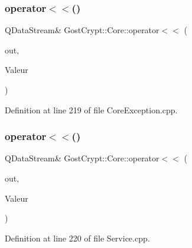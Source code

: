 \subsubsection{\texorpdfstring{operator$<$$<$()}{operator<<()}\hspace{0.1cm}{\footnotesize\ttfamily [42/56]}}
{\footnotesize\ttfamily Q\+Data\+Stream\& Gost\+Crypt\+::\+Core\+::operator$<$$<$ (\begin{DoxyParamCaption}\item[{Q\+Data\+Stream \&}]{out,  }\item[{const \hyperlink{class_gost_crypt_1_1_core_1_1_filesystem_not_supported}{Gost\+Crypt\+::\+Core\+::\+Filesystem\+Not\+Supported} \&}]{Valeur }\end{DoxyParamCaption})}



Definition at line 219 of file Core\+Exception.\+cpp.

\mbox{\label{namespace_gost_crypt_1_1_core_a0b68987ff3609bef2da3e26cef99bd51}} 
\subsubsection{\texorpdfstring{operator$<$$<$()}{operator<<()}\hspace{0.1cm}{\footnotesize\ttfamily [43/56]}}
{\footnotesize\ttfamily Q\+Data\+Stream\& Gost\+Crypt\+::\+Core\+::operator$<$$<$ (\begin{DoxyParamCaption}\item[{Q\+Data\+Stream \&}]{out,  }\item[{const \hyperlink{class_gost_crypt_1_1_core_1_1_unknow_response}{Gost\+Crypt\+::\+Core\+::\+Unknow\+Response} \&}]{Valeur }\end{DoxyParamCaption})}



Definition at line 220 of file Service.\+cpp.

\mbox{\label{namespace_gost_crypt_1_1_core_adb0e3f40cef0b2dc609f318818a147ee}} 
